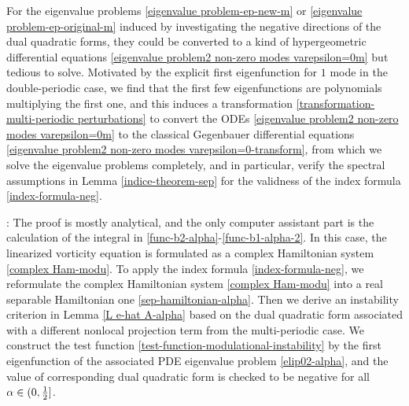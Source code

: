 \documentclass[1 [leqno, 11pt]{amsart}
\numberwithin{equation}{section}
\begin{document}
\begin{CJK*}{GBK}{song}
For the  eigenvalue problems \eqref{eigenvalue problem-ep-new-m} or \eqref{eigenvalue problem-ep-original-m} induced by investigating the negative directions of the dual quadratic forms, they could be converted to a kind of  hypergeometric differential equations \eqref{eigenvalue problem2 non-zero modes varepsilon=0m} but tedious to solve. Motivated by the explicit first  eigenfunction for $1$ mode in the double-periodic case, we find that the first few eigenfunctions are polynomials multiplying the first one, and this induces a transformation \eqref{transformation-multi-periodic perturbations} to convert the ODEs \eqref{eigenvalue problem2 non-zero modes varepsilon=0m} to the classical Gegenbauer differential equations \eqref{eigenvalue problem2 non-zero modes varepsilon=0-transform}, from which we solve the eigenvalue problems completely, and in particular, verify the spectral assumptions in Lemma \ref{indice-theorem-sep} for  the validness of the index formula \eqref{index-formula-neg}.
\fi








:
 The proof  is mostly analytical, and the  only computer assistant part is  the calculation of the integral in \eqref{func-b2-alpha}-\eqref{func-b1-alpha-2}.
In  this case, the linearized vorticity equation  is formulated as a complex Hamiltonian system \eqref{complex Ham-modu}.
 To apply the index formula \eqref{index-formula-neg},
we reformulate the complex Hamiltonian system \eqref{complex Ham-modu} into a real separable Hamiltonian one \eqref{sep-hamiltonian-alpha}. Then we
derive an instability criterion in Lemma \ref{L e-hat A-alpha} based on  the dual quadratic form associated with a different nonlocal projection term from the multi-periodic case. We construct the
 test function \eqref{test-function-modulational-instability} by  the  first  eigenfunction of the associated PDE eigenvalue problem \eqref{elip02-alpha}, and  the value of corresponding  dual quadratic form is checked to be negative for all $\alpha\in(0,{1\over2}]$.


\end{CJK*}
\end{document}
